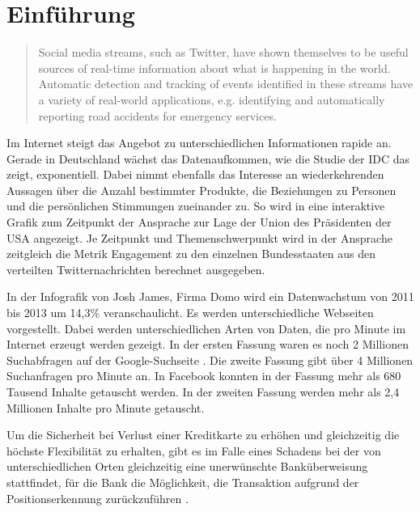 \chapter{Einführung}
\label{chapter:einfuehrung}

\begin{quote}
Social media streams, such as Twitter, have shown themselves to be useful sources of real-time information about what is happening in the world. Automatic detection and tracking of events identified in these streams have a variety of real-world applications, e.g. identifying and automatically reporting road accidents for emergency services.
\end{quote}

Im Internet steigt das Angebot zu unterschiedlichen Informationen rapide an. Gerade in Deutschland wächst das Datenaufkommen, wie die Studie der IDC  das zeigt, exponentiell. Dabei nimmt ebenfalls das Interesse an wiederkehrenden Aussagen über die Anzahl bestimmter Produkte, die Beziehungen zu Personen und die persönlichen Stimmungen zueinander zu. So wird in  eine interaktive Grafik zum Zeitpunkt der Ansprache zur Lage der Union des Präsidenten der USA angezeigt. Je Zeitpunkt und Themenschwerpunkt wird in der Ansprache zeitgleich die Metrik Engagement zu den einzelnen Bundesstaaten aus den verteilten Twitternachrichten berechnet ausgegeben.
%

In der Infografik  von Josh James, Firma Domo wird ein Datenwachstum von 2011 bis 2013 um 14,3\% veranschaulicht. Es werden unterschiedliche Webseiten vorgestellt. Dabei werden unterschiedlichen Arten von Daten, die pro Minute im Internet erzeugt werden gezeigt. 
In der ersten Fassung  waren es noch 2 Millionen Suchabfragen auf der Google-Suchseite . Die zweite Fassung gibt über 4 Millionen Suchanfragen pro Minute an. In Facebook  konnten in der Fassung mehr als 680 Tausend Inhalte getauscht werden. In der zweiten Fassung werden mehr als 2,4 Millionen Inhalte pro Minute getauscht. 

Um die Sicherheit bei Verlust einer Kreditkarte zu erhöhen und gleichzeitig die höchste Flexibilität zu erhalten, gibt es im Falle eines Schadens bei der von unterschiedlichen Orten gleichzeitig eine unerwünschte Banküberweisung stattfindet, für die Bank die Möglichkeit, die Transaktion aufgrund der Positionserkennung zurückzuführen .

